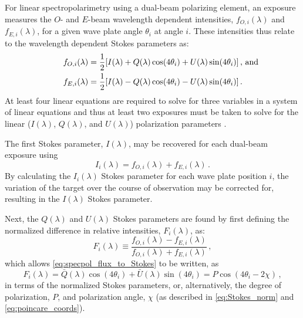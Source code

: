 For linear spectropolarimetry using a dual-beam polarizing element, an exposure measures the $O$- and $E$-beam wavelength dependent intensities, $f_{O, i}(\lambda)$ and $f_{E, i}(\lambda)$, for a given wave plate angle $\theta_{i}$ at angle $i$.
These intensities thus relate to the wavelength dependent Stokes parameters as:
\begin{equation} \label{eq:specpol_flux_to_Stokes}
    \begin{aligned}
        f_{O, i}(\lambda) &= \frac{1}{2} [I(\lambda) + Q(\lambda)\cos(4\theta_{i}) + U(\lambda)\sin(4\theta_{i})] \rlap{\,,\ and}\\
        f_{E, i}(\lambda) &= \frac{1}{2} [I(\lambda) - Q(\lambda)\cos(4\theta_{i}) - U(\lambda)\sin(4\theta_{i})]\,.
    \end{aligned}
\end{equation}
At least four linear equations are required to solve for three variables in a system of linear equations and thus at least two exposures must be taken to solve for the linear ($I(\lambda)$, $Q(\lambda)$, and $U(\lambda)$) polarization parameters \citep{pol_std, keller_instr}.

The first Stokes parameter, $I(\lambda)$, may be recovered for each dual-beam exposure using
\begin{equation} \label{eq:specpol_I_calc}
    I_{i}(\lambda) = f_{O, i}(\lambda) + f_{E, i}(\lambda)\,.
\end{equation}
By calculating the $I_{i}(\lambda)$ Stokes parameter for each wave plate position $i$, the variation of the target over the course of observation may be corrected for, resulting in the $I(\lambda)$ Stokes parameter.

Next, the $Q(\lambda)$ and $U(\lambda)$ Stokes parameters are found by first defining the normalized difference in relative intensities, $F_{i}(\lambda)$, as:
\begin{equation} \label{eq:specpol_norm_flux}
    F_{i}(\lambda) \equiv \frac{f_{O, i}(\lambda) - f_{E, i}(\lambda)}{f_{O, i}(\lambda) + f_{E, i}(\lambda)}\,,
\end{equation}
which allows \autoref{eq:specpol_flux_to_Stokes} to be written, as
\begin{equation} \label{eq:specpol_F_to_params}
    F_{i}(\lambda) = \bar{Q}(\lambda) \cos(4\theta_{i}) + \bar{U}(\lambda) \sin(4\theta_{i}) = P\cos(4\theta_{i} - 2\chi)\,,
\end{equation}
in terms of the normalized Stokes parameters, or, alternatively, the degree of polarization, $P$, and polarization angle, $\chi$ (as described in \autoref{eq:Stokes_norm} and \ref{eq:poincare_coords}).

